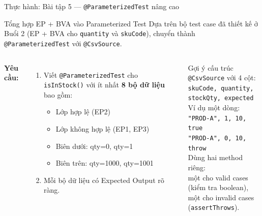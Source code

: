 \documentclass[aspectratio=169,12pt]{beamer}
\begin{document}
\begin{frame}[shrink=12]{Thực hành: Bài tập 5 --- \texttt{@ParameterizedTest} nâng cao}
  \begin{block}{Tổng hợp EP + BVA vào Parameterized Test}
    Dựa trên bộ test case đã thiết kế ở Buổi 2 (EP + BVA cho \texttt{quantity}
    và \texttt{skuCode}), chuyển thành \texttt{@ParameterizedTest} với
    \texttt{@CsvSource}.
  \end{block}

  \vspace{0.3em}
  \begin{columns}
    \textbf{Yêu cầu:}
    \begin{enumerate}
      \item Viết \texttt{@ParameterizedTest} cho
        \texttt{isInStock()} với ít nhất \textbf{8 bộ dữ liệu} bao gồm:
        \begin{itemize}
          \item Lớp hợp lệ (EP2)
          \item Lớp không hợp lệ (EP1, EP3)
          \item Biên dưới: qty=0, qty=1
          \item Biên trên: qty=1000, qty=1001
        \end{itemize}
      \item Mỗi bộ dữ liệu có Expected Output rõ ràng.
    \end{enumerate}

    \begin{exampleblock}{Gợi ý cấu trúc}
      \texttt{@CsvSource} với 4 cột:\\
      \texttt{skuCode, quantity, stockQty, expected}\\[0.3em]
      Ví dụ một dòng:\\
      \texttt{"PROD-A", 1, 10, true}\\
      \texttt{"PROD-A", 0, 10, throw}\\[0.3em]
      Dùng hai method riêng:\\
      một cho valid cases (kiểm tra boolean),\\
      một cho invalid cases (\texttt{assertThrows}).
    \end{exampleblock}
  \end{columns}
\end{frame}
\end{document}
